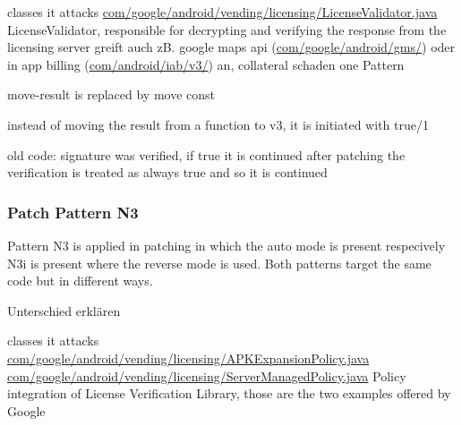 classes it attacks %
\url{com/google/android/vending/licensing/LicenseValidator.java}
LicenseValidator, responsible for decrypting and verifying the response from the licensing server\cite{developersLicensingReference}
greift auch zB. google maps api (\url{com/google/android/gms/}) oder in app billing (\url{com/android/iab/v3/}) an, collateral schaden
one Pattern



move-result is replaced by move const



instead of moving the result from a function to v3, it is initiated with true/1



old code: signature was verified, if true it is continued
after patching the verification is treated as always true and so it is continued
\subsubsection{Patch Pattern N3}
Pattern N3 is applied in patching in which the auto mode is present respecively N3i is present where the reverse mode is used. Both patterns target the same code but in different ways.

Unterschied erklären

classes it attacks %
\url{com/google/android/vending/licensing/APKExpansionPolicy.java}
\url{com/google/android/vending/licensing/ServerManagedPolicy.java}
Policy integration of License Verification Library, those are the two examples offered by Google\cite{developersLicensingReference}



